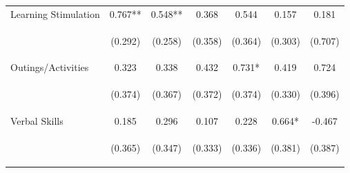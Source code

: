 \begin{tabular}{lcccccc}
\noalign{\smallskip}Learning Stimulation & 0.767** & 0.548** & 0.368 & 0.544 & 0.157 & 0.181\\
 & \begin{footnotesize}(0.292)\end{footnotesize} & \begin{footnotesize}(0.258)\end{footnotesize} & \begin{footnotesize}(0.358)\end{footnotesize} & \begin{footnotesize}(0.364)\end{footnotesize} & \begin{footnotesize}(0.303)\end{footnotesize} & \begin{footnotesize}(0.707)\end{footnotesize}\\
\noalign{\smallskip}Outings/Activities & 0.323 & 0.338 & 0.432 & 0.731* & 0.419 & 0.724\\
 & \begin{footnotesize}(0.374)\end{footnotesize} & \begin{footnotesize}(0.367)\end{footnotesize} & \begin{footnotesize}(0.372)\end{footnotesize} & \begin{footnotesize}(0.374)\end{footnotesize} & \begin{footnotesize}(0.330)\end{footnotesize} & \begin{footnotesize}(0.396)\end{footnotesize}\\
\noalign{\smallskip}Verbal Skills & 0.185 & 0.296 & 0.107 & 0.228 & 0.664* & -0.467\\
 & \begin{footnotesize}(0.365)\end{footnotesize} & \begin{footnotesize}(0.347)\end{footnotesize} & \begin{footnotesize}(0.333)\end{footnotesize} & \begin{footnotesize}(0.336)\end{footnotesize} & \begin{footnotesize}(0.381)\end{footnotesize} & \begin{footnotesize}(0.387)\end{footnotesize}\\

\end{tabular}
